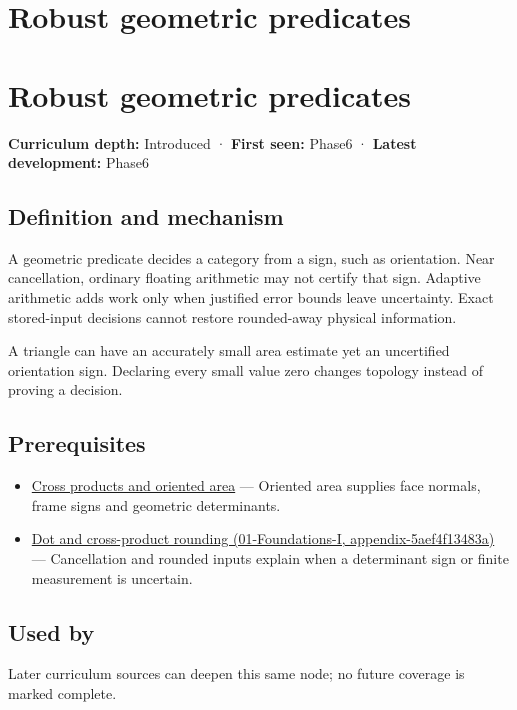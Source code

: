 \hypertarget{appendix-341296fb3f64}{}
\section*{Robust geometric predicates}
\section{Robust geometric predicates}\label{robust-geometric-predicates}

\textbf{Curriculum depth:} Introduced · \textbf{First seen:} Phase6 · \textbf{Latest development:} Phase6

\subsection{Definition and mechanism}\label{definition-and-mechanism}

A geometric predicate decides a category from a sign, such as orientation. Near cancellation, ordinary floating arithmetic may not certify that sign. Adaptive arithmetic adds work only when justified error bounds leave uncertainty. Exact stored-input decisions cannot restore rounded-away physical information.

A triangle can have an accurately small area estimate yet an uncertified orientation sign. Declaring every small value zero changes topology instead of proving a decision.

\subsection{Prerequisites}\label{prerequisites}

\begin{itemize}
\tightlist
\item
  \hyperref[appendix-2391db8052b1]{Cross products and oriented area} --- Oriented area supplies face normals, frame signs and geometric determinants.
\item
  \href{}{Dot and cross-product rounding (01-Foundations-I, appendix-5aef4f13483a)} --- Cancellation and rounded inputs explain when a determinant sign or finite measurement is uncertain.
\end{itemize}

\subsection{Used by}\label{used-by}

Later curriculum sources can deepen this same node; no future coverage is marked complete.

